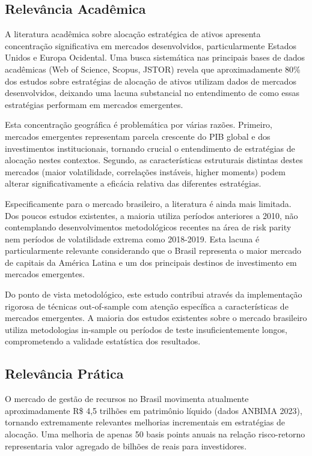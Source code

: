 \subsection{Relevância Acadêmica}

A literatura acadêmica sobre alocação estratégica de ativos apresenta concentração significativa em mercados desenvolvidos, particularmente Estados Unidos e Europa Ocidental. Uma busca sistemática nas principais bases de dados acadêmicas (Web of Science, Scopus, JSTOR) revela que aproximadamente 80\% dos estudos sobre estratégias de alocação de ativos utilizam dados de mercados desenvolvidos, deixando uma lacuna substancial no entendimento de como essas estratégias performam em mercados emergentes.

Esta concentração geográfica é problemática por várias razões. Primeiro, mercados emergentes representam parcela crescente do PIB global e dos investimentos institucionais, tornando crucial o entendimento de estratégias de alocação nestes contextos. Segundo, as características estruturais distintas destes mercados (maior volatilidade, correlações instáveis, higher moments) podem alterar significativamente a eficácia relativa das diferentes estratégias.

Especificamente para o mercado brasileiro, a literatura é ainda mais limitada. Dos poucos estudos existentes, a maioria utiliza períodos anteriores a 2010, não contemplando desenvolvimentos metodológicos recentes na área de risk parity nem períodos de volatilidade extrema como 2018-2019. Esta lacuna é particularmente relevante considerando que o Brasil representa o maior mercado de capitais da América Latina e um dos principais destinos de investimento em mercados emergentes.

Do ponto de vista metodológico, este estudo contribui através da implementação rigorosa de técnicas out-of-sample com atenção específica a características de mercados emergentes. A maioria dos estudos existentes sobre o mercado brasileiro utiliza metodologias in-sample ou períodos de teste insuficientemente longos, comprometendo a validade estatística dos resultados.

\subsection{Relevância Prática}

O mercado de gestão de recursos no Brasil movimenta atualmente aproximadamente R\$ 4,5 trilhões em patrimônio líquido (dados ANBIMA 2023), tornando extremamente relevantes melhorias incrementais em estratégias de alocação. Uma melhoria de apenas 50 basis points anuais na relação risco-retorno representaria valor agregado de bilhões de reais para investidores.


